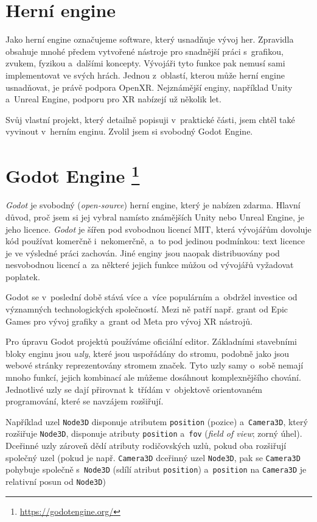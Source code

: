 \section{Herní engine}

Jako herní engine označujeme software, který usnadňuje vývoj her. Zpravidla obsahuje mnohé předem vytvořené nástroje pro snadnější práci s~grafikou, zvukem, fyzikou a~dalšími koncepty. Vývojáři tyto funkce pak nemusí sami implementovat ve svých hrách. Jednou z~oblastí, kterou může herní engine usnadňovat, je právě podpora OpenXR. Nejznámější enginy, například Unity a~Unreal Engine, podporu pro XR nabízejí už několik let. \cite{enwiki:1186405367}

Svůj vlastní projekt, který detailně popisuji v~praktické části, jsem chtěl také vyvinout v~herním enginu. Zvolil jsem si svobodný Godot Engine.

\section[Godot Engine]{Godot Engine \protect\footnote{\url{https://godotengine.org/}}}

\textit{Godot} je svobodný (\textit{open-source}) herní engine, který je nabízen zdarma. Hlavní důvod, proč jsem si jej vybral namísto známějších Unity nebo Unreal Engine, je jeho licence. \textit{Godot} je šířen pod svobodnou licencí MIT, která vývojářům dovoluje kód používat komerčně i~nekomerčně, a~to pod jedinou podmínkou: text licence je ve výsledné práci zachován. Jiné enginy jsou naopak distribuovány pod nesvobodnou licencí a~za některé jejich funkce můžou od vývojářů vyžadovat poplatek.

Godot se v~poslední době stává více a~více populárním a~obdržel investice od významných technologických společností. Mezi ně patří např. grant od Epic Games pro vývoj grafiky a~grant od Meta pro vývoj XR nástrojů. \cite{godot_epicgames} \cite{godot_meta}

Pro úpravu Godot projektů používáme oficiální editor. Základními stavebními bloky enginu jsou \textit{uzly}, které jsou uspořádány do stromu, podobně jako jsou webové stránky reprezentovány stromem značek. Tyto uzly samy o~sobě nemají mnoho funkcí, jejich kombinací ale můžeme dosáhnout komplexnějšího chování. Jednotlivé uzly se dají přirovnat k~třídám v~objektově orientovaném programování, které se navzájem rozšiřují.

Například uzel \texttt{Node3D} disponuje atributem \texttt{position} (pozice) a~\texttt{Camera3D}, který rozšiřuje \texttt{Node3D}, disponuje atributy \texttt{position} a~\texttt{fov} (\textit{field of view}; zorný úhel). Dceřinné uzly zároveň dědí atributy rodičovských uzlů, pokud oba rozšiřují společný uzel (pokud je např. \texttt{Camera3D} dceřinný uzel \texttt{Node3D}, pak se \texttt{Camera3D} pohybuje společně s~\texttt{Node3D} (sdílí atribut \texttt{position}) a~\texttt{position} na \texttt{Camera3D} je relativní posun od \texttt{Node3D})

